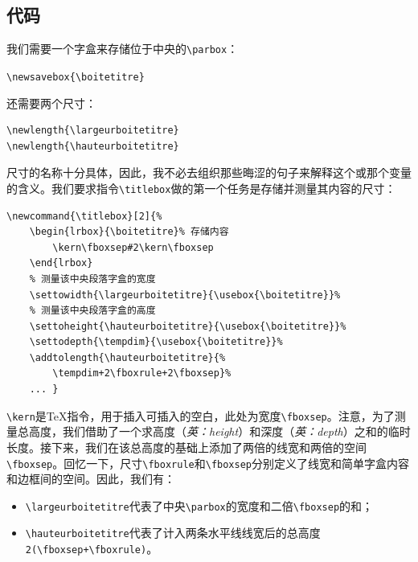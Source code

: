 \subsection{代码}

我们需要一个字盒来存储位于中央的\verb|\parbox|：

\begin{dmd}
\verb|\newsavebox{\boitetitre}|
\end{dmd}

还需要两个尺寸：

\begin{dmd}
\begin{verbatim}
\newlength{\largeurboitetitre}
\newlength{\hauteurboitetitre}
\end{verbatim}
\end{dmd}

尺寸的名称十分具体，因此，我不必去组织那些晦涩的句子来解释这个或那个变量的含义。我们要求指令\verb|\titlebox|做的第一个任务是存储并测量其内容的尺寸：

\begin{dmd}
\begin{verbatim}
\newcommand{\titlebox}[2]{% 
    \begin{lrbox}{\boitetitre}% 存储内容
        \kern\fboxsep#2\kern\fboxsep
    \end{lrbox}
    % 测量该中央段落字盒的宽度 
    \settowidth{\largeurboitetitre}{\usebox{\boitetitre}}% 
    % 测量该中央段落字盒的高度
    \settoheight{\hauteurboitetitre}{\usebox{\boitetitre}}% 
    \settodepth{\tempdim}{\usebox{\boitetitre}}% 
    \addtolength{\hauteurboitetitre}{%
        \tempdim+2\fboxrule+2\fboxsep}%
    ... }
\end{verbatim}
\end{dmd}

\verb|\kern|是\TeX 指令，用于插入可插入的空白，此处为宽度\verb|\fboxsep|。注意，为了测量总高度，我们借助了一个求高度（\emph{英：height}）和深度（\emph{英：depth}）之和的临时长度。接下来，我们在该总高度的基础上添加了两倍的线宽和两倍的空间\verb|\fboxsep|。回忆一下，尺寸\verb|\fboxrule|和\verb|\fboxsep|分别定义了线宽和简单字盒内容和边框间的空间。因此，我们有：

\begin{itemize}
    \item \verb|\largeurboitetitre|代表了中央\verb|\parbox|的宽度和二倍\verb|\fboxsep|的和；
    \item \verb|\hauteurboitetitre|代表了计入两条水平线线宽后的总高度\verb|2(\fboxsep+\fboxrule)|。
\end{itemize}

